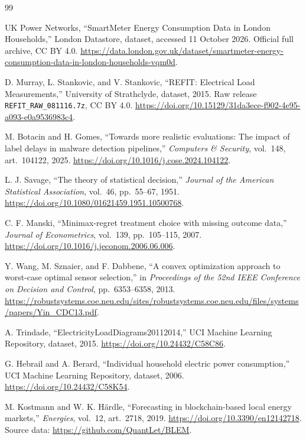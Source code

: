 \documentclass[12pt]{article}
\begin{document}
\begin{thebibliography}{99}

 UK Power Networks, ``SmartMeter Energy Consumption Data in
London Households,'' London Datastore, dataset, accessed 11 October 2026.
Official full archive, CC BY 4.0.
\url{https://data.london.gov.uk/dataset/smartmeter-energy-consumption-data-in-london-households-vqm0d}.

 D. Murray, L. Stankovic, and V. Stankovic,
``REFIT: Electrical Load Measurements,'' University of Strathclyde, dataset,
2015. Raw release \texttt{REFIT\_RAW\_081116.7z}, CC BY 4.0.
\url{https://doi.org/10.15129/31da3ece-f902-4e95-a093-e0a9536983c4}.

 M. Botacin and H. Gomes, ``Towards more realistic
evaluations: The impact of label delays in malware detection pipelines,''
\emph{Computers \& Security}, vol.~148, art.~104122, 2025.
\url{https://doi.org/10.1016/j.cose.2024.104122}.

 L. J. Savage, ``The theory of statistical decision,''
\emph{Journal of the American Statistical Association}, vol.~46,
pp.~55--67, 1951. \url{https://doi.org/10.1080/01621459.1951.10500768}.

 C. F. Manski, ``Minimax-regret treatment choice
with missing outcome data,'' \emph{Journal of Econometrics}, vol.~139,
pp.~105--115, 2007. \url{https://doi.org/10.1016/j.jeconom.2006.06.006}.

 Y. Wang, M. Sznaier, and F. Dabbene,
``A convex optimization approach to worst-case optimal sensor selection,''
in \emph{Proceedings of the 52nd IEEE Conference on Decision and Control},
pp.~6353--6358, 2013.
\url{https://robustsystems.coe.neu.edu/sites/robustsystems.coe.neu.edu/files/systems/papers/Yin_CDC13.pdf}.

 A. Trindade, ``ElectricityLoadDiagrams20112014,''
UCI Machine Learning Repository, dataset, 2015.
\url{https://doi.org/10.24432/C58C86}.

 G. Hebrail and A. Berard, ``Individual household electric
power consumption,'' UCI Machine Learning Repository, dataset, 2006.
\url{https://doi.org/10.24432/C58K54}.

 M. Kostmann and W. K. H\"ardle,
``Forecasting in blockchain-based local energy markets,''
\emph{Energies}, vol.~12, art.~2718, 2019.
\url{https://doi.org/10.3390/en12142718}.
Source data: \url{https://github.com/QuantLet/BLEM}.


\end{thebibliography}
\end{document}
